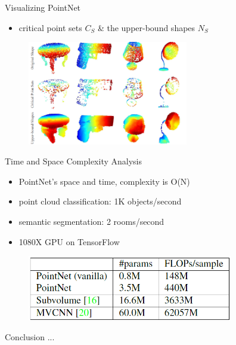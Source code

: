 \documentclass[serif,mathserif]{beamer}
\begin{document}
\begin{frame}{Visualizing PointNet}
	\begin{itemize}
		\item critical point sets $ C_S $ \& the upper-bound shapes $ N_S $
	\end{itemize}
	
	\begin{figure}
		\includegraphics[width=7cm]{image/visual.png}
	\end{figure}
\end{frame}

\begin{frame}{Time and Space Complexity Analysis}
	\begin{itemize}
		\item PointNet’s space and time, complexity is O(N)
		\item point cloud classification: 1K objects/second
		\item semantic segmentation: 2 rooms/second
		\item 1080X GPU on TensorFlow
	\end{itemize}
	\begin{figure}
		\includegraphics[width=9cm]{image/time.png}
	\end{figure}
\end{frame}

\begin{frame}{Conclusion}
	...
\end{frame}
\end{document}
